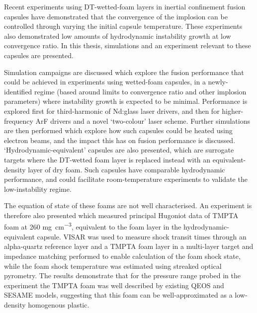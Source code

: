 Recent experiments using DT-wetted-foam layers in inertial confinement fusion capsules have demonstrated that the convergence of the implosion can be controlled through varying the initial capsule temperature. These experiments also demonstrated low amounts of hydrodynamic instability growth at low convergence ratio. In this thesis, simulations and an experiment relevant to these capsules are presented. 

Simulation campaigns are discussed which explore the fusion performance that could be achieved in experiments using wetted-foam capsules, in a newly-identified regime (based around limits to convergence ratio and other implosion parameters) where instability growth is expected to be minimal. Performance is explored first for third-harmonic of Nd:glass laser drivers, and then for higher-frequency ArF drivers and a novel `two-colour' laser scheme. Further simulations are then performed which explore how such capsules could be heated using electron beams, and the impact this has on fusion performance is discussed. `Hydrodynamic-equivalent' capsules are also presented, which are surrogate targets where the DT-wetted foam layer is replaced instead with an equivalent-density layer of dry foam. Such capsules have comparable hydrodynamic performance, and could facilitate room-temperature experiments to validate the low-instability regime.

The equation of state of these foams are not well characterised. An experiment is therefore also presented which measured principal Hugoniot data of TMPTA foam at 260 \unit{\milli\gram\per\centi\meter\cubed}, equivalent to the foam layer in the hydrodynamic-equivalent capsule. VISAR was used to measure shock transit times through an alpha-quartz reference layer and a TMPTA foam layer in a multi-layer target and impedance matching performed to enable calculation of the foam shock state, while the foam shock temperature was estimated using streaked optical pyrometry. The results demonstrate that for the pressure range probed in the experiment the TMPTA foam was well described by existing QEOS and SESAME models, suggesting that this foam can be well-approximated as a low-density homogenous plastic.